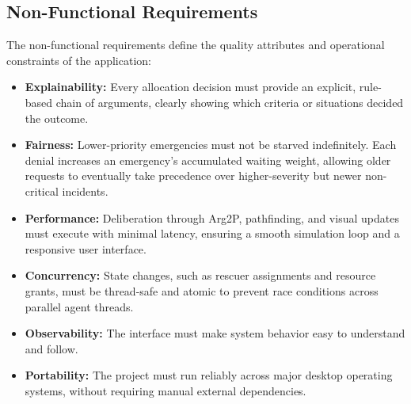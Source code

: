 \subsection{Non-Functional Requirements}
\label{subsec:non_functional_requirements}

The non-functional requirements define the quality attributes and operational constraints of the application:

\begin{itemize}
    \item \textbf{Explainability:} Every allocation decision must provide an explicit, rule-based chain of arguments, clearly showing which criteria or situations decided the outcome.
    
    \item \textbf{Fairness:} Lower-priority emergencies must not be starved indefinitely. Each denial increases an emergency's accumulated waiting weight, allowing older requests to eventually take precedence over higher-severity but newer non-critical incidents.
    
    \item \textbf{Performance:} Deliberation through Arg2P, pathfinding, and visual updates must execute with minimal latency, ensuring a smooth simulation loop and a responsive user interface.
    
    \item \textbf{Concurrency:} State changes, such as rescuer assignments and resource grants, must be thread-safe and atomic to prevent race conditions across parallel agent threads.
    
    \item \textbf{Observability:} The interface must make system behavior easy to understand and follow.
    
    \item \textbf{Portability:} The project must run reliably across major desktop operating systems, without requiring manual external dependencies.
\end{itemize}
